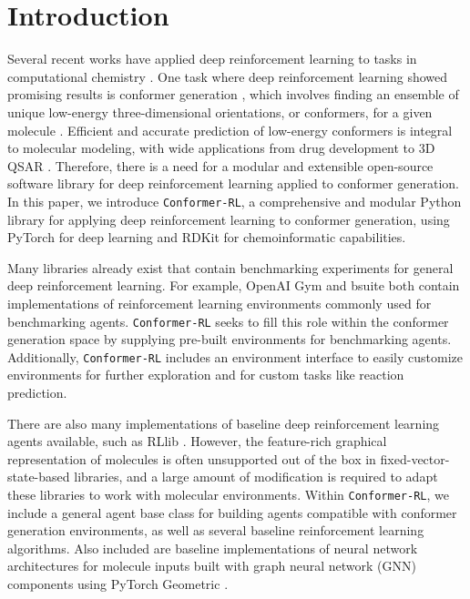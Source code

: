 \documentclass[twoside,11pt]{article}
\newcommand{\code}[1]{\texttt{#1}}
\newcommand{\titleofpaper}{Conformer-RL}
\newcommand{\genComment}[2]{\ifnum\comments=1{\color{#1}{\textsf{\footnotesize #2}}}\fi}
\newcommand{\tarun}[1] {\genComment{blue}{[TG: #1]}}
\newcommand{\runxuan}[1]{\genComment{pink}{[RJ:#1]}}
\begin{document}
\section{Introduction}
Several recent works have applied deep reinforcement learning to tasks in computational chemistry \citep{li2018foldingzero,zhou2017reactions,simm2020moldesign}. One task where deep reinforcement learning showed promising results is conformer generation \citep{gogineni2020torsionnet}, which involves finding an ensemble of unique low-energy three-dimensional orientations, or conformers, for a given molecule \citep{ebejer2020confgen}. Efficient and accurate prediction of low-energy conformers is integral to molecular modeling, with wide applications from drug development to 3D QSAR \citep{cole2018confgen}. Therefore, there is a need for a modular and extensible open-source software library for deep reinforcement learning applied to conformer generation.
In this paper, we introduce \code{\titleofpaper}, a comprehensive and modular Python library for applying deep reinforcement learning to conformer generation, using PyTorch \citep{torch} for deep learning and RDKit \citep{Landrum2016rdkit} for chemoinformatic capabilities.

Many libraries already exist that contain benchmarking experiments for general deep reinforcement learning. For example, OpenAI Gym \citep{brockman2016gym} and bsuite \citep{osband2020bsuite} both contain implementations of reinforcement learning environments commonly used for benchmarking agents. \code{\titleofpaper} seeks to fill this role within the conformer generation space by supplying pre-built environments for benchmarking agents. Additionally, \code{\titleofpaper} includes an environment interface to easily customize environments for further exploration and for custom tasks like reaction prediction.

There are also many implementations of baseline deep reinforcement learning agents available, such as RLlib \citep{liang2018rllib}. However, the feature-rich graphical representation of molecules is often unsupported out of the box in fixed-vector-state-based libraries, and a large amount of modification is required to adapt these libraries to work with molecular environments. Within \code{\titleofpaper}, we include a general agent base class for building agents compatible with conformer generation environments, as well as several baseline reinforcement learning algorithms. Also included are baseline implementations of neural network architectures for molecule inputs built with graph neural network (GNN) components using PyTorch Geometric \citep{fey2019geometric}.
\end{document}
